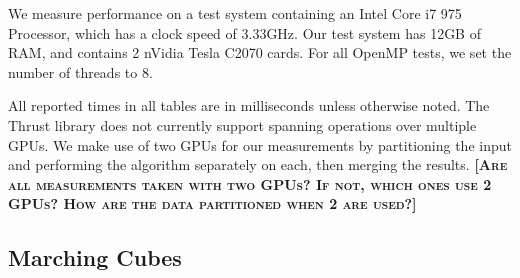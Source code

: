 \documentclass[10pt,journal,cspaper,compsoc]{IEEEtran}
\newcommand{\fix}[1]{{\color{red}\textbf{\textsc{[#1]}}}}
\begin{document}



We measure performance on a test system containing an Intel Core i7 975 Processor, which has a clock speed of 3.33GHz. Our test system has 12GB of RAM, and contains 2 nVidia Tesla C2070 cards. For all OpenMP tests, we set the number of threads to 8.



All reported times in all tables are in milliseconds unless otherwise noted.  The Thrust library does not currently support spanning operations over multiple GPUs. We make use of two GPUs for our measurements by partitioning the input and performing the algorithm separately on each, then merging the results.  \fix{Are all measurements taken with two GPUs?  If not, which ones use 2 GPUs?  How are the data partitioned when 2 are used?}

\subsection{Marching Cubes}
\end{document}
